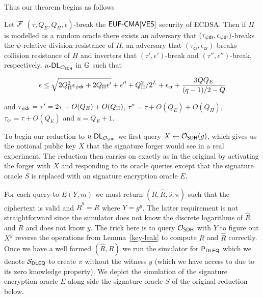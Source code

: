 Thus our theorem begins as follows

\begin{theorem}
  Let $\mathcal{F}$ $(\tau,Q_E,Q_\Pi,\epsilon)$-break the $\textsf{EUF-CMA}[\textsf{VES}]$ security of ECDSA.
  Then if $\Pi$ is modelled as a random oracle there exists an adversary
  that $(\tau_{\psi{}\textsf{dr}},\epsilon_{\psi{}\textsf{dr}})$-breaks the $\psi$-relative division resistance of $H$, an adversary that $(\tau_{\textsf{cr}}, \epsilon_{\textsf{cr}})$-breaks collision resistance of $H$ and inverters that $(\tau', \epsilon')$-break and $(\tau'', \epsilon'')$-break, respectively, $u\text{-}\textsf{DL}_{\mathcal{O}_{\textsf{SDH}}}$ in $\mathbb{G}$ such that

  \[ \epsilon \leq \sqrt{2Q_{\Pi}^2\epsilon_{\psi{}\textsf{dr}} + 2Q_{\Pi}\epsilon' } + \epsilon'' + Q_{\Pi}^2/2^L + \epsilon_{\textsf{cr}} + \frac{3QQ_E}{(q-1)/2-Q}  \]

  \hfill \break and $\tau_{\psi{}\textsf{dr}} = \tau' = 2\tau + O(Q_E) + O(Q_{\Pi})$, $\tau'' = \tau + O(Q_{E})+ O(Q_{\Pi})$, $\tau_{\textsf{cr}} = \tau + O(Q_E)$ and $u = Q_E + 1$.


\end{theorem}

To begin our reduction to $u\text{-}\textsf{DL}_{\mathcal{O}_{\textsf{SDH}}}$ we first query $X \gets \mathcal{O}_{\textsf{SDH}}(g)$, which gives us the notional public key $X$ that the signature forger would see in a real experiment.
The reduction then carries on exactly as in the original by activating the forger with $X$ and responding to its oracle queries except that the signature oracle $S$ is replaced with an signature encryption oracle $E$.

For each query to $E(Y,m)$ we must return $(R,\hat{R}, \hat{s}, \pi)$ such that the ciphertext is valid and $\hat{R}^y = R$ where $Y = g^y$.
The latter requirement is not straightforward since the simulator does not know the discrete logarithms of $\hat{R}$ and $R$ and does not know $y$.
The trick here is to query $\mathcal{O}_{\textsf{SDH}}$ with $Y$ to figure out $X^y$ reverse the operations from Lemma~\ref{key-leak} to compute $R$ and $\hat{R}$ correctly.
Once we have a well formed $(\hat{R}, R)$ we run the simulator for $\mathsf{P}_{\textsf{DLEQ}}$ which we denote $\mathcal{S}_{\textsf{DLEQ}}$ to create $\pi$ without the witness $y$ (which we have access to due to its zero knowledge property).
We depict the simulation of the signature encryption oracle $E$ along side the signature oracle $S$ of the original reduction below.

